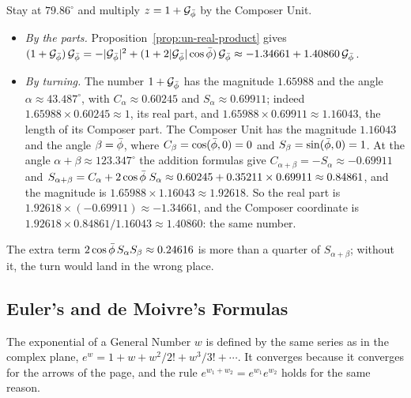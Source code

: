 \begin{workedexample}
Stay at $79.86^\circ$ and multiply $z = 1 + \mathcal{G}_{\bar{\phi}}$ by the Composer Unit.
\begin{itemize}
  \item \emph{By the parts.} Proposition~\ref{prop:un-real-product} gives $(1 + \mathcal{G}_{\bar{\phi}})\,\mathcal{G}_{\bar{\phi}} = -|\mathcal{G}_{\bar{\phi}}|^2 + (1 + 2|\mathcal{G}_{\bar{\phi}}|\cos\bar{\phi})\,\mathcal{G}_{\bar{\phi}} \approx -1.34661 + 1.40860\,\mathcal{G}_{\bar{\phi}}$.
  \item \emph{By turning.} The number $1 + \mathcal{G}_{\bar{\phi}}$ has the magnitude $1.65988$ and the angle $\alpha \approx 43.487^\circ$, with $C_\alpha \approx 0.60245$ and $S_\alpha \approx 0.69911$; indeed $1.65988 \times 0.60245 \approx 1$, its real part, and $1.65988 \times 0.69911 \approx 1.16043$, the length of its Composer part. The Composer Unit has the magnitude $1.16043$ and the angle $\beta = \bar{\phi}$, where $C_\beta = \cos(\bar{\phi}, 0) = 0$ and $S_\beta = \sin(\bar{\phi}, 0) = 1$. At the angle $\alpha + \beta \approx 123.347^\circ$ the addition formulas give $C_{\alpha + \beta} = -S_\alpha \approx -0.69911$ and $S_{\alpha + \beta} = C_\alpha + 2\cos\bar{\phi}\;S_\alpha \approx 0.60245 + 0.35211 \times 0.69911 \approx 0.84861$, and the magnitude is $1.65988 \times 1.16043 \approx 1.92618$. So the real part is $1.92618 \times (-0.69911) \approx -1.34661$, and the Composer coordinate is $1.92618 \times 0.84861/1.16043 \approx 1.40860$: the same number.
\end{itemize}
The extra term $2\cos\bar{\phi}\,S_\alpha S_\beta \approx 0.24616$ is more than a quarter of $S_{\alpha + \beta}$; without it, the turn would land in the wrong place.
\end{workedexample}

\subsection{Euler's and de Moivre's Formulas}\label{subsec:gn-euler}

The exponential of a General Number $w$ is defined by the same series as in the complex plane, $e^w = 1 + w + w^2/2! + w^3/3! + \cdots$. It converges because it converges for the arrows of the page, and the rule $e^{w_1 + w_2} = e^{w_1}e^{w_2}$ holds for the same reason.

